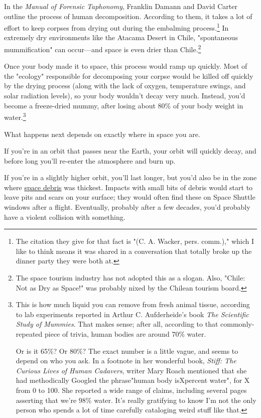 {{In the \emph{Manual of Forensic Taphonomy}, Franklin Damann and David Carter outline the process of human decomposition. According to them, it takes a lot of effort to keep corpses from drying out during the embalming process.{\footnote{The citation they give for that fact is "(C. A. Wacker, pers. comm.)," which I like to think means it was shared in a conversation that totally broke up the dinner party they were both at.} } In extremely dry environments like the Atacama Desert in Chile, "spontaneous mummification" can occur—and space is even drier than Chile.{\footnote{The space tourism industry has not adopted this as a slogan. Also, "Chile: Not as Dry as Space!" was probably nixed by the Chilean tourism board.} } }

{Once your body made it to space, this process would ramp up quickly. Most of the "ecology" responsible for decomposing your corpse would be killed off quickly by the drying process (along with the lack of oxygen, temperature swings, and solar radiation levels), so your body wouldn't decay very much. Instead, you'd become a freeze-dried mummy, after losing about 80\% of your body weight in water.{\footnote{This is how much liquid you can remove from fresh animal tissue, according to lab experiments reported in Arthur C. Aufderheide's book \emph{The Scientific Study of Mummies}. That makes sense; after all, according to that commonly-repeated piece of trivia, human bodies are around 70\% water.

Or is it 65\%? Or 80\%? The exact number is a little vague, and seems to depend on who you ask. In a footnote in her wonderful book, \emph{Stiff: The Curious Lives of Human Cadavers}, writer Mary Roach mentioned that she had methodically Googled the phrase"human body isXpercent water", for X from 0 to 100. She reported a wide range of claims, including several pages asserting that we're 98\% water. It's really gratifying to know I'm not the only person who spends a lot of time carefully cataloging weird stuff like that.} } }

{What happens next depends on exactly where in space you are.}

{If you're in an orbit that passes near the Earth, your orbit will quickly decay, and before long you'll re-enter the atmosphere and burn up.}

{If you're in a slightly higher orbit, you'll last longer, but you'd also be in the zone where \href{http://commons.erau.edu/cgi/viewcontent.cgi?article=1000&context=stm}{space debris} was thickest. Impacts with small bits of debris would start to leave pits and scars on your surface; they would often find these on Space Shuttle windows after a flight. Eventually, probably after a few decades, you'd probably have a violent collision with something.}

}
